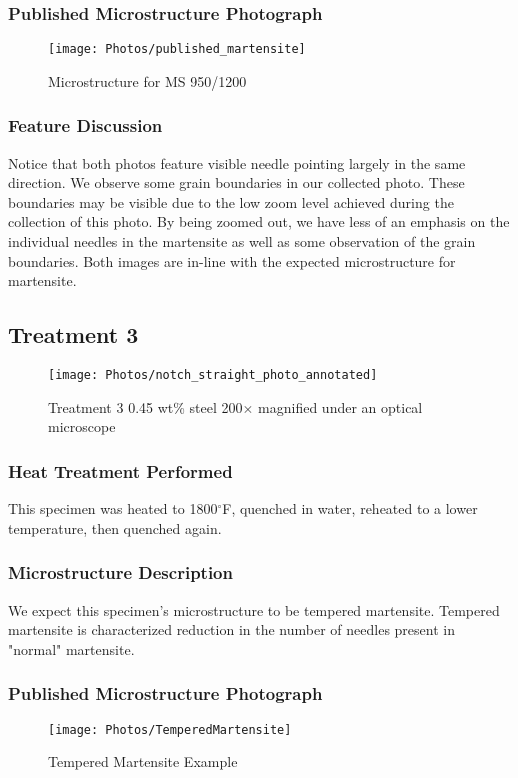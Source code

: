 \documentclass{article}
\newcommand{\degf}{$^\circ $F}
\begin{document}
\subsubsection*{Published Microstructure Photograph}
\begin{figure}[H]
\centering
\texttt{[image: Photos/published\_martensite]}
\caption{Microstructure for MS 950/1200}
\end{figure}

\subsubsection*{Feature Discussion}
Notice that both photos feature visible needle pointing largely in the same direction. We observe some grain boundaries in our collected photo. These boundaries may be visible due to the low zoom level achieved during the collection of this photo. By being zoomed out, we have less of an emphasis on the individual needles in the martensite as well as some observation of the grain boundaries. Both images are in-line with the expected microstructure for martensite.

\newpage

\subsection*{Treatment 3}
\begin{figure}[H]
\centering
\texttt{[image: Photos/notch\_straight\_photo\_annotated]}
\caption{Treatment 3 0.45 wt\% steel 200$\times$ magnified under an optical microscope}
\end{figure}

\subsubsection*{Heat Treatment Performed}
This specimen was heated to 1800\degf, quenched in water, reheated to a lower temperature, then quenched again.

\subsubsection*{Microstructure Description}
We expect this specimen's microstructure to be tempered martensite. Tempered martensite is characterized reduction in the number of needles present in "normal" martensite. \cite{ref:msSteel,ref:engMaterials2}

\subsubsection*{Published Microstructure Photograph}
\begin{figure}[H]
\centering
\texttt{[image: Photos/TemperedMartensite]}
\caption{Tempered Martensite Example}
\end{figure}
\end{document}
